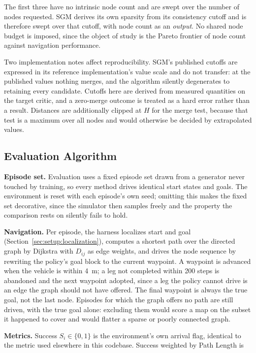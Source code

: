 The first three have no intrinsic node count and are swept over the number of
nodes requested. SGM derives its own sparsity from its consistency cutoff and is
therefore swept over that cutoff, with node count as an \emph{output}. No shared
node budget is imposed, since the object of study is the Pareto frontier of node
count against navigation performance.

Two implementation notes affect reproducibility. SGM's published cutoffs are
expressed in its reference implementation's value scale and do not transfer: at
the published values nothing merges, and the algorithm silently degenerates to
retaining every candidate. Cutoffs here are derived from measured quantities on
the target critic, and a zero-merge outcome is treated as a hard error rather
than a result. Distances are additionally clipped at $H$ for the merge test,
because that test is a maximum over all nodes and would otherwise be decided by
extrapolated values.

\subsection{Evaluation Algorithm}
\label{sec:setup:eval}

\textbf{Episode set.} Evaluation uses a fixed episode set drawn from a generator
never touched by training, so every method drives identical start states and
goals. The environment is reset with each episode's own seed; omitting this
makes the fixed set decorative, since the simulator then samples freely and the
property the comparison rests on silently fails to hold.

\textbf{Navigation.} Per episode, the harness localizes start and goal
(Section~\ref{sec:setup:localization}), computes a shortest path over the
directed graph by Dijkstra with $D_{ij}$ as edge weights, and drives the node
sequence by rewriting the policy's goal block to the current waypoint. A
waypoint is advanced when the vehicle is within \SI{4}{\meter}; a leg not
completed within \num{200} steps is abandoned and the next waypoint adopted,
since a leg the policy cannot drive is an edge the graph should not have
offered. The final waypoint is always the true goal, not the last node.
Episodes for which the graph offers no path are still driven, with the true goal
alone: excluding them would score a map on the subset it happened to cover and
would flatter a sparse or poorly connected graph.

\textbf{Metrics.} Success $S_i \in \{0,1\}$ is the environment's own arrival
flag, identical to the metric used elsewhere in this codebase. Success weighted
by Path Length is

